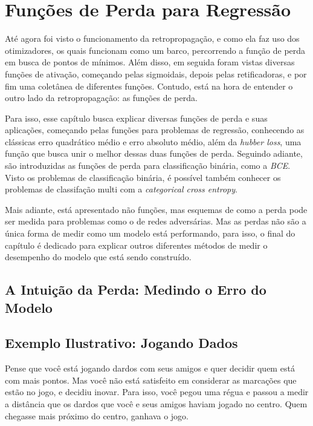 
\chapter{Funções de Perda para Regressão}
\label{cap:perda-regressao}

Até agora foi visto o funcionamento da retropropagação, e como ela faz uso dos otimizadores, os quais funcionam como um barco, percorrendo a função de perda em busca de pontos de mínimos. Além disso, em seguida foram vistas diversas funções de ativação, começando pelas sigmoidais, depois pelas retificadoras, e por fim uma coletânea de diferentes funções. Contudo, está na hora de entender o outro lado da retropropagação: as funções de perda.

Para isso, esse capítulo busca explicar diversas funções de perda e suas aplicações, começando pelas funções para problemas de regressão, conhecendo as clássicas erro quadrático médio e erro absoluto médio, além da \textit{hubber loss}, uma função que busca unir o melhor dessas duas funções de perda. Seguindo adiante, são introduzidas as funções de perda para classificação binária, como a \textit{BCE}. Visto os problemas de classificação binária, é possível também conhecer os problemas de classifação multi com a \textit{categorical cross entropy}.

Mais adiante, está apresentado não funções, mas esquemas de como a perda pode ser medida para problemas como o de redes adversárias. Mas as perdas não são a única forma de medir como um modelo está performando, para isso, o final do capítulo é dedicado para explicar outros diferentes métodos de medir o desempenho do modelo que está sendo construído.

\section{A Intuição da Perda: Medindo o Erro do Modelo}

\section{Exemplo Ilustrativo: Jogando Dados}

Pense que você está jogando dardos com seus amigos e quer decidir quem está com mais pontos. Mas você não está satisfeito em considerar as marcações que estão no jogo, e decidiu inovar. Para isso, você pegou uma régua e passou a medir a distância que os dardos que você e seus amigos haviam jogado no centro. Quem chegasse mais próximo do centro, ganhava o jogo.

